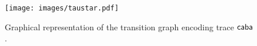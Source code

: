 %

\begin{figure}[!t]
	\centering
	\texttt{[image: images/taustar.pdf]}
	\caption{Graphical representation of the transition graph encoding trace $\mathsf{caba}$.}\label{fig:taustar}
\end{figure}
%

